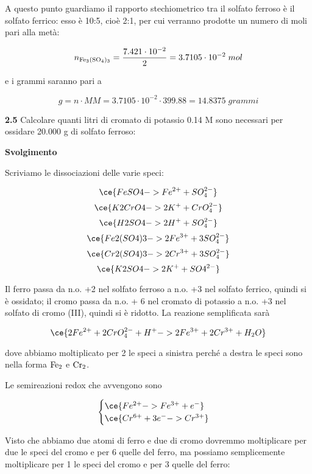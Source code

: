 A questo punto guardiamo il rapporto stechiometrico tra il solfato ferroso è il solfato ferrico: esso è 10:5, cioè 2:1, per cui verranno prodotte un numero di moli pari alla metà:

$$n_{\rm Fe_3(SO_4)_3}=\frac{7.421 \cdot 10^{-2}}{2}=3.7105 \cdot 10^{-2}\;mol$$

e i grammi saranno pari a 

$$g=n \cdot MM=3.7105 \cdot 10^{-2} \cdot 399.88=14.8375\;grammi$$

\vspace{0.2cm}\textbf{2.5} Calcolare quanti litri di cromato di potassio 0.14 M sono necessari per ossidare 20.000 g di solfato ferroso:
\begin{center}

\end{center}

\large\textbf{Svolgimento}\normalsize

\vspace{0.2cm}Scriviamo le dissociazioni delle varie speci:

$$\ce{FeSO4 -> Fe^{2+} + SO_4^{2-}}$$
$$\ce{K2CrO4 -> 2K^+ + CrO_4^{2-}}$$
$$\ce{H2SO4 -> 2H^+ + SO_4^{2-}}$$
$$\ce{Fe2(SO4)3 -> 2Fe^{3+} + 3SO_4^{2-}}$$
$$\ce{Cr2(SO4)3 -> 2Cr^{3+} + 3SO_4^{2-}}$$
$$\ce{K2SO4 -> 2K^+ + SO4^{2-}}$$

Il ferro passa da n.o. +2 nel solfato ferroso a n.o. +3 nel solfato ferrico, quindi si è ossidato; il cromo passa da n.o. + 6 nel cromato di potassio a n.o. +3 nel solfato di cromo (III), quindi si è ridotto. La reazione semplificata sarà

$$\ce{2Fe^{2+} + 2CrO_4^{2-} + H^+ -> 2Fe^{3+} + 2Cr^{3+} + H_2O}$$

dove abbiamo moltiplicato per 2 le speci a sinistra perché a destra le speci sono nella forma $\rm Fe_2$ e $\rm Cr_2$.

Le semireazioni redox che avvengono sono

$$\begin{cases}
    \ce{Fe^{2+} -> Fe^{3+} + e^-}\\
    \ce{Cr^{6+} + 3e^- -> Cr^{3+}}
\end{cases}$$

Visto che abbiamo due atomi di ferro e due di cromo dovremmo moltiplicare per due le speci del cromo e per 6 quelle del ferro, ma possiamo semplicemente moltiplicare per 1 le speci del cromo e per 3 quelle del ferro:

